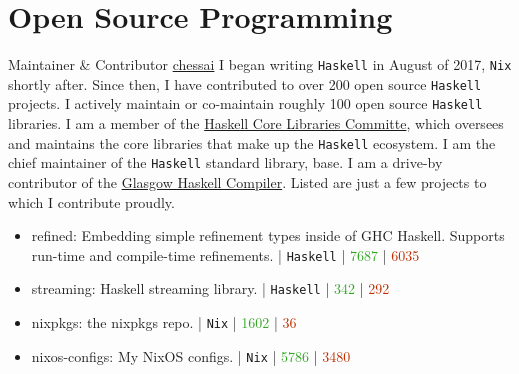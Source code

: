 \documentclass[10pt,letterpaper,sans]{moderncv}
\newcommand{\wlink}[2]{\textcolor[HTML]{461645}{\href{#1}{#2}}}
\newcommand{\ghlink}[2]{\wlink{https://github.com/#1}{#2}}
\newcommand{\ghrepo}[1]{\ghlink{#1}{\faGithub}}
\newcommand{\ghlang}[1]{\texttt{#1}}
\newcommand{\ghadd}[1]{\textcolor[HTML]{30A622}{{\faPlusCircle} #1}}
\newcommand{\ghrem}[1]{\textcolor[HTML]{BD2C00}{{\faMinusCircle} #1}}
\newcommand{\ghub}[4]{\ghrepo{#2} | \ghlang{#1} | \ghadd{#3} | \ghrem{#4}}
\newcommand{\lang}[1]{\texttt{#1}}
\begin{document}

\section{Open Source Programming}
  {Maintainer \& Contributor}
  {\wlink{https://github.com/chessai}{chessai}}
  {\newline I began writing \lang{Haskell} in August of 2017, \lang{Nix} shortly after. Since then, I have contributed to over 200 open source \lang{Haskell} projects. I actively maintain or co-maintain roughly 100 open source \lang{Haskell} libraries. I am a member of the \wlink{https://wiki.haskell.org/Core_Libraries_Committee}{Haskell Core Libraries Committe}, which oversees and maintains the core libraries that make up the \lang{Haskell} ecosystem. I am the chief maintainer of the \lang{Haskell} standard library, base. I am a drive-by contributor of the \wlink{https://www.haskell.org/ghc/}{Glasgow Haskell Compiler}. Listed are just a few projects to which I contribute proudly.
  }
  {}
  {
\begin{itemize}
  \item refined: Embedding simple refinement types inside of GHC Haskell. Supports run-time and compile-time refinements. \newline \ghub{Haskell}{chessai/refined}{7687}{6035}
  \item streaming: Haskell streaming library. \newline \ghub{Haskell}{haskell-streaming/streaming}{342}{292}
  \item nixpkgs: the nixpkgs repo. \newline \ghub{Nix}{NixOS/nixpkgs}{1602}{36}
  \item nixos-configs: My NixOS configs. \newline \ghub{Nix}{chessai/nixos-configs}{5786}{3480}
\end{itemize}
}
\end{document}

